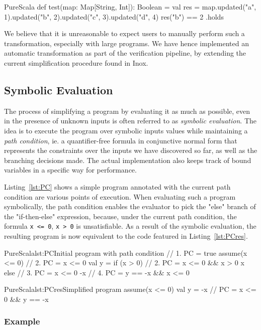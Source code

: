 \documentclass[a4paper,twoside]{article}
\newcommand{\RefCode}[1]{Listing~\ref{#1}}
\newcommand{\stt}[1]{\texttt{\small{#1}}}
\begin{document}
\begin{ShortCode}{PureScala}
def test(map: Map[String, Int]): Boolean = {
  val res = map.updated("a", 1).updated("b", 2).updated("c", 3).updated("d", 4)
  res("b") == 2
}.holds
\end{ShortCode}

We believe that it is unreasonable to expect users to manually perform such a transformation, especially with large programs. We have hence implemented an automatic transformation as part of the verification pipeline, by extending the current simplification procedure found in Inox.

\subsection{Symbolic Evaluation}

The process of simplifying a program by evaluating it as much as possible, even in the presence of unknown inputs is often referred to as \textit{symbolic evaluation}. The idea is to execute the program over symbolic inputs values while maintaining a \textit{path condition}, ie. a quantifier-free formula in conjunctive normal form that represents the constraints over the inputs we have discovered so far, as well as the branching decisions made. The actual implementation also keeps track of bound variables in a specific way for performance.

\RefCode{lst:PC} shows a simple program annotated with the current path condition are various points of execution. When evaluating such a program symbolically, the path condition enables the evaluator to pick the "else" branch of the "if-then-else" expression, because, under the current path condition, the formula \stt{x <= 0}, \stt{x > 0} is unsatisfiable. As a result of the symbolic evaluation, the resulting program is now equivalent to the code featured in \RefCode{lst:PCres}.

\begin{Code}{PureScala}{lst:PC}{Initial program with path condition}
// 1. PC = true
assume(x <= 0)
// 2. PC = x <= 0
val y = if (x > 0) {
  // 2. PC = x <= 0 && x > 0
  x
} else {
  // 3. PC = x <= 0
  -x
}
// 4. PC = y == -x && x <= 0
\end{Code}

\begin{Code}{PureScala}{lst:PCres}{Simplified program}
assume(x <= 0)
val y = -x
// PC = x <= 0 && y == -x
\end{Code}

\subsubsection{Example}
\end{document}
